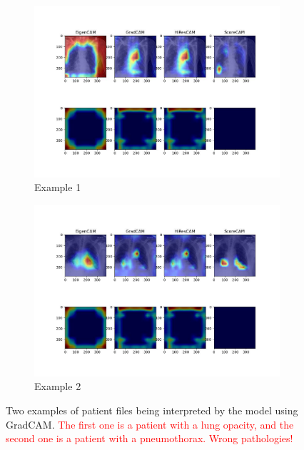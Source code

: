 \documentclass[11pt]{article}
\newcommand\myworries[1]{\textcolor{red}{#1}}
\begin{document}
        \begin{figure}[H]
                 \centering
                 \begin{subfigure}[b]{\textwidth}
                     \centering
                     \includegraphics[width=\textwidth]{plots/heatmaps_2}
                     \caption{Example 1}
                     \vspace{4ex}

                 \end{subfigure}
                 \hfill
                 \begin{subfigure}[b]{\textwidth}
                     \centering
                     \includegraphics[width=\textwidth]{plots/heatmaps_5}
                     \caption{Example 2}
                     \vspace{4ex}

                 \end{subfigure}
                 \label{fig:gradcam_example_chexpert_4}
                 \caption{Two examples of patient files being interpreted by the model using GradCAM. \myworries{The first one is a patient with a lung opacity, and the second one is a patient with a pneumothorax. Wrong pathologies!}}

            \end{figure}
\end{document}
